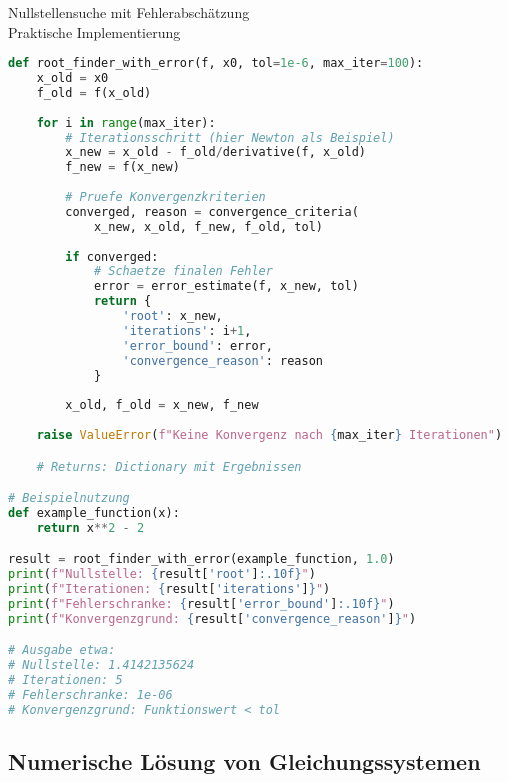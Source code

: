 \begin{examplecode}{Nullstellensuche mit Fehlerabschätzung} \\
    Praktische Implementierung
\begin{lstlisting}[language=Python, style=basesmol]
def root_finder_with_error(f, x0, tol=1e-6, max_iter=100):
    x_old = x0
    f_old = f(x_old)
    
    for i in range(max_iter):
        # Iterationsschritt (hier Newton als Beispiel)
        x_new = x_old - f_old/derivative(f, x_old)
        f_new = f(x_new)
        
        # Pruefe Konvergenzkriterien
        converged, reason = convergence_criteria(
            x_new, x_old, f_new, f_old, tol)
            
        if converged:
            # Schaetze finalen Fehler
            error = error_estimate(f, x_new, tol)
            return {
                'root': x_new,
                'iterations': i+1,
                'error_bound': error,
                'convergence_reason': reason
            }
            
        x_old, f_old = x_new, f_new
        
    raise ValueError(f"Keine Konvergenz nach {max_iter} Iterationen")

    # Returns: Dictionary mit Ergebnissen

# Beispielnutzung
def example_function(x):
    return x**2 - 2

result = root_finder_with_error(example_function, 1.0)
print(f"Nullstelle: {result['root']:.10f}")
print(f"Iterationen: {result['iterations']}")
print(f"Fehlerschranke: {result['error_bound']:.10f}")
print(f"Konvergenzgrund: {result['convergence_reason']}")

# Ausgabe etwa:
# Nullstelle: 1.4142135624
# Iterationen: 5
# Fehlerschranke: 1e-06
# Konvergenzgrund: Funktionswert < tol

\end{lstlisting}
\end{examplecode}

\subsection{Numerische Lösung von Gleichungssystemen}

